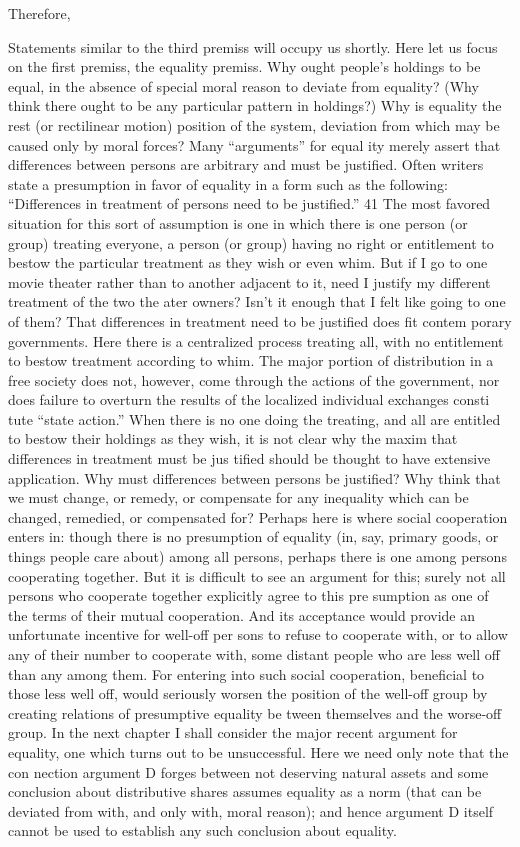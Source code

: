 \documentclass[11pt,openany]{book}
\begin{document}
Therefore, 

Statements similar to the third premiss will occupy us shortly. Here let us focus on the first premiss, the equality premiss. Why ought people's holdings to be equal, in the absence of special moral reason to deviate from equality? (Why think there ought to be any particular pattern in holdings?) Why is equality the rest (or rectilinear motion) position of the system, deviation from which may be caused only by moral forces? Many ``arguments'' for equal ity merely assert that differences between persons are arbitrary and must be justified. Often writers state a presumption in favor of equality in a form such as the following: ``Differences in treatment of persons need to be justified.'' 41 The most favored situation for this sort of assumption is one in which there is one person (or group) treating everyone, a person (or group) having no right or entitlement to bestow the particular treatment as they wish or even whim. But if I go to one movie theater rather than to another adjacent to it, need I justify my different treatment of the two the ater owners? Isn't it enough that I felt like going to one of them? That differences in treatment need to be justified does fit contem porary governments. Here there is a centralized process treating all, with no entitlement to bestow treatment according to whim. The major portion of distribution in a free society does not, however, come through the actions of the government, nor does failure to overturn the results of the localized individual exchanges consti tute ``state action.'' When there is no one doing the treating, and all are entitled to bestow their holdings as they wish, it is not clear why the maxim that differences in treatment must be jus tified should be thought to have extensive application. Why must differences between persons be justified? Why think that we must change, or remedy, or compensate for any inequality which can be changed, remedied, or compensated for? Perhaps here is where social cooperation enters in: though there is no presumption of equality (in, say, primary goods, or things people care about) among all persons, perhaps there is one among persons cooperating together. But it is difficult to see an argument for this; surely not all persons who cooperate together explicitly agree to this pre sumption as one of the terms of their mutual cooperation. And its acceptance would provide an unfortunate incentive for well-off per sons to refuse to cooperate with, or to allow any of their number to cooperate with, some distant people who are less well off than any among them. For entering into such social cooperation, beneficial to those less well off, would seriously worsen the position of the well-off group by creating relations of presumptive equality be tween themselves and the worse-off group. In the next chapter I shall consider the major recent argument for equality, one which turns out to be unsuccessful. Here we need only note that the con nection argument D forges between not deserving natural assets and some conclusion about distributive shares assumes equality as a norm (that can be deviated from with, and only with, moral reason); and hence argument D itself cannot be used to establish any such conclusion about equality. 
\end{document}
